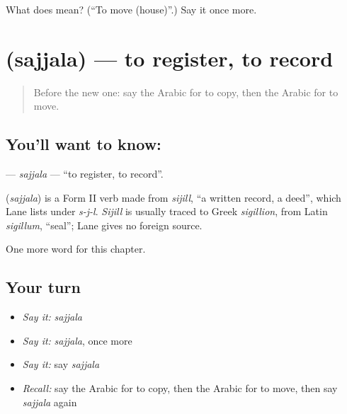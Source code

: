 \begin{tcolorbox}[breakable,colback=teal!4,colframe=teal!35!black,title={Before you move on}]
What does  mean? (\textquotedblleft{}To move (house)\textquotedblright{}.) Say it once more.
\end{tcolorbox}
\section[\texorpdfstring{\ar{سجل} (sajjala)}{سجل (sajjala)}]{ (sajjala) — to register, to record}

\label{lesson:AR-C162-sajjala}



\begin{quote}
Before the new one: say the Arabic for to copy, then the Arabic for to move.
\end{quote}

\subsection*{You'll want to know: }
\textbf{} — \emph{sajjala} — \textquotedblleft{}to register, to record\textquotedblright{}.

\begin{cousinweb}
\textbf{} (\emph{sajjala}) is a Form II verb made from \emph{sijill}, \textquotedblleft{}a written record, a deed\textquotedblright{}, which Lane lists under \emph{s-j-l}. \emph{Sijill} is usually traced to Greek \emph{sigillion}, from Latin \emph{sigillum}, \textquotedblleft{}seal\textquotedblright{}; Lane gives no foreign source.
\end{cousinweb}

\begin{grammarlens}[title={What you've built}]
One more word for this chapter.
\end{grammarlens}

\subsection*{Your turn}
\begin{itemize}
\raggedright
  \item \emph{Say it:} \emph{sajjala}
  \item \emph{Say it:} \emph{sajjala}, once more
  \item \emph{Say it:} say \emph{sajjala}
  \item \emph{Recall:} say the Arabic for to copy, then the Arabic for to move, then say \emph{sajjala} again
\end{itemize}

